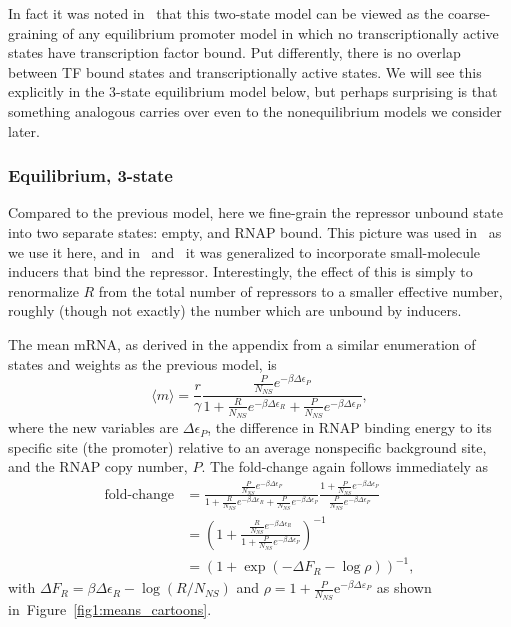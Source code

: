 \documentclass[12pt]{article}%
\newcommand{\fig}[1]{Figure~\ref{#1}}
\begin{document}
In fact it was noted in~\cite{Chure2019} that this two-state
model can be viewed as the coarse-graining of any equilibrium
promoter model in which no transcriptionally active states have
transcription factor bound. Put differently, there is no overlap
between TF bound states and transcriptionally active states. We
will see this explicitly in the 3-state equilibrium model below,
but perhaps surprising is that something analogous carries over
even to the nonequilibrium models we consider later.

\subsubsection{Equilibrium, 3-state}
Compared to the previous model, here we fine-grain the repressor
unbound state into two separate states: empty, and RNAP bound.
This picture was used in~\cite{Garcia2011a} as we use it here,
and in~\cite{Razo-Mejia2018} and~\cite{Chure2019} it was generalized
to incorporate small-molecule inducers that bind the repressor.
Interestingly, the effect of this is simply to renormalize $R$
from the total number of repressors to a smaller effective number,
roughly (though not exactly) the number which are unbound by inducers.

The mean mRNA, as derived in the appendix from a similar
enumeration of states and weights as the previous model, is
\begin{equation}
\langle m \rangle = \frac{r}{\gamma}
\frac{\frac{P}{N_{NS}} e^{-\beta\Delta\epsilon_P}}
        {
        1 + \frac{R}{N_{NS}} e^{-\beta\Delta\epsilon_R}
        + \frac{P}{N_{NS}} e^{-\beta\Delta\epsilon_P}
        },
\end{equation}
where the new variables are $\Delta\epsilon_P$, the difference in
RNAP binding energy to its specific site (the promoter) relative
to an average nonspecific background site, and the RNAP copy
number, $P$. The fold-change again follows immediately as
\begin{align}
\text{fold-change}
&= \frac{\frac{P}{N_{NS}} e^{-\beta\Delta\epsilon_P}}
        {
        1 + \frac{R}{N_{NS}} e^{-\beta\Delta\epsilon_R}
        + \frac{P}{N_{NS}} e^{-\beta\Delta\epsilon_P}
        }
\frac{1 + \frac{P}{N_{NS}} e^{-\beta\Delta\epsilon_P}}
        {\frac{P}{N_{NS}} e^{-\beta\Delta\epsilon_P}}
\\
&= \left(
1 + \frac{\frac{R}{N_{NS}} e^{-\beta\Delta\epsilon_R}}
        {1 + \frac{P}{N_{NS}} e^{-\beta\Delta\epsilon_P}}
\right)^{-1}
\\
&= (1 + \exp(-\Delta F_R - \log\rho))^{-1},
\end{align}
with $\Delta F_R = \beta\Delta\epsilon_R - \log(R/N_{NS})$
and $\rho = 1 + \frac{P}{N_{NS}}\mathrm{e}^{-\beta\Delta\varepsilon_P}$
as shown in~\fig{fig1:means_cartoons}.
\end{document}

